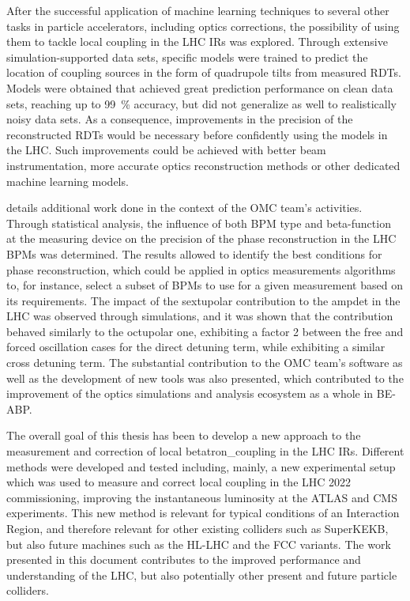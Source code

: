 After the successful application of machine learning techniques to several other tasks in particle accelerators, including optics corrections, the possibility of using them to tackle local coupling in the \gls{LHC} \glspl{IR} was explored.
Through extensive simulation-supported data sets, specific models were trained to predict the location of coupling sources in the form of quadrupole tilts from measured \glspl{RDT}.
Models were obtained that achieved great prediction performance on clean data sets, reaching up to \qty{99}{\percent} accuracy, but did not generalize as well to realistically noisy data sets.
As a consequence, improvements in the precision of the reconstructed \glspl{RDT} would be necessary before confidently using the models in the \gls{LHC}.
Such improvements could be achieved with better beam instrumentation, more accurate optics reconstruction methods or other dedicated machine learning models.
\break

 details additional work done in the context of the \gls{OMC} team's activities.
Through statistical analysis, the influence of both \gls{BPM} type and \gls{beta-function} at the measuring device on the precision of the phase reconstruction in the \gls{LHC} \glspl{BPM} was determined.
The results allowed to identify the best conditions for phase reconstruction, which could be applied in optics measurements algorithms to, for instance, select a subset of \glspl{BPM} to use for a given measurement based on its requirements.
The impact of the sextupolar contribution to the \gls{ampdet} in the \gls{LHC} was observed through simulations, and it was shown that the contribution behaved similarly to the octupolar one, exhibiting a factor \num{2} between the free and forced oscillation cases for the direct detuning term, while exhibiting a similar cross detuning term.
The substantial contribution to the \gls{OMC} team's software as well as the development of new tools was also presented, which contributed to the improvement of the optics simulations and analysis ecosystem as a whole in \acrshort{BE}-\acrshort{ABP}.
\break
{}

The overall goal of this thesis has been to develop a new approach to the measurement and correction of local \gls{betatron_coupling} in the \gls{LHC} \glspl{IR}.
Different methods were developed and tested including, mainly, a new experimental setup which was used to measure and correct local coupling in the \gls{LHC} \num{2022} commissioning, improving the instantaneous luminosity at the \acrshort{ATLAS} and \acrshort{CMS} \glspl{experiment}.
This new method is relevant for typical conditions of an Interaction Region, and therefore relevant for other existing colliders such as SuperKEKB, but also future machines such as the \gls{HL-LHC} and the \gls{FCC} variants.
The work presented in this document contributes to the improved performance and understanding of the \gls{LHC}, but also potentially other present and future particle colliders.


\glsresetall                                     %
